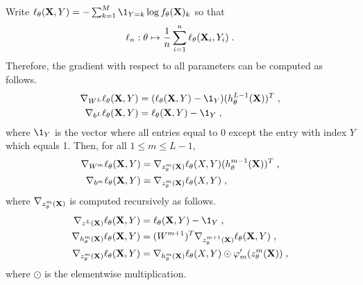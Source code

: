 \begin{shaded}
\begin{proposition}
\label{prop:backpropagation:classif}
Write $\ell_{\theta}(\bX,Y) =  -\sum_{k=1}^{M} \1_{Y=k}\log f_{\theta}(\bX)_k$ so that 
$$
\ell_n:\theta \mapsto \frac{1}{n} \sum_{i=1}^n \ell_{\theta}(\mathbf{X}_i,Y_i)\;. 
$$
Therefore, the gradient with respect to all parameters can be computed as follows.
\begin{align*}
\nabla_{W^L} \ell_{\theta}(\bX,Y) &= (\ell_{\theta}(\bX,Y) - \1_Y)(h_{\theta}^{L-1}(\bX))^T\eqsp,\\
\nabla_{b^L} \ell_{\theta}(\bX,Y) &= \ell_{\theta}(\bX,Y) - \1_Y\eqsp,
\end{align*}
where $\1_Y$ is the vector where all entries equal to 0 except the entry with index $Y$ which equals 1. Then, for all $1\leqslant m\leqslant L-1$,
\begin{align*}
\nabla_{W^m} \ell_{\theta}(\mathbf{X},Y) &= \nabla_{z_{\theta}^m(\mathbf{X})}\ell_{\theta}(X,Y)(h_{\theta}^{m-1}(\mathbf{X}))^T\;,\\
\nabla_{b^m} \ell_{\theta}(\mathbf{X},Y) &=  \nabla_{z_{\theta}^m(\mathbf{X})}\ell_{\theta}(X,Y)\;,
\end{align*}
where $\nabla_{z_{\theta}^m(\mathbf{X})}$ is computed recursively as follows.
\begin{align*}
\nabla_{z^L(\bX)} \ell_{\theta}(\bX,Y) &= \ell_{\theta}(\bX,Y) - \1_Y\eqsp,\\
\nabla_{h_{\theta}^m(\bX)} \ell_{\theta}(\bX,Y) &= (W^{m+1})^T\nabla_{z_{\theta}^{m+1}(\bX)} \ell_{\theta}(\bX,Y) \eqsp,\\
\nabla_{z_{\theta}^m(\bX)} \ell_{\theta}(\bX,Y) &= \nabla_{h_{\theta}^m(\bX)}\ell_{\theta}(X,Y) \odot \varphi_m'(z_{\theta}^{m}(\bX))\eqsp,
\end{align*}
where $\odot$ is the elementwise multiplication.
\end{proposition}
\end{shaded}
